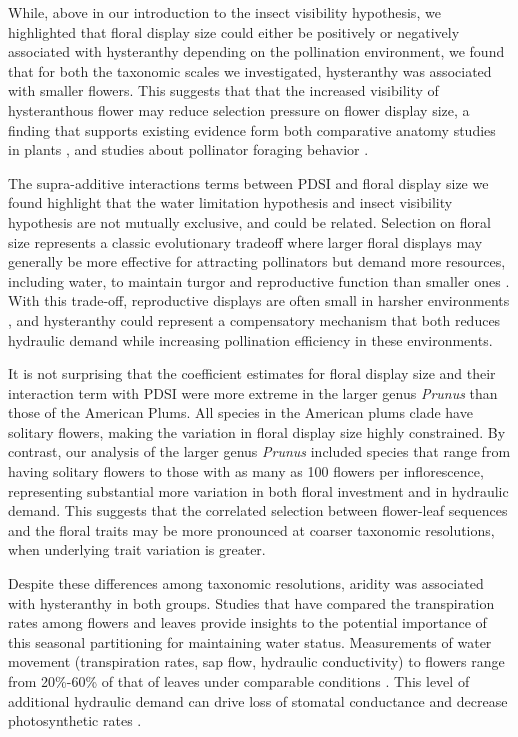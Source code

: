 \documentclass{article}[12pt]
\begin{document}
While, above in our introduction to the insect visibility hypothesis, we highlighted that floral display size could either be positively or negatively associated with hysteranthy depending on the pollination environment, we found that for both the taxonomic scales we investigated, hysteranthy was associated with smaller flowers. This suggests that that the increased visibility of hysteranthous flower may reduce selection pressure on flower display size, a finding that supports existing evidence form both comparative anatomy studies in plants \citep{Gunatilleke1984}, and studies about pollinator foraging behavior \citep{Forrest:2009aa,Rivest:2017aa}.

The supra-additive interactions terms between PDSI and floral display size we found highlight that the water limitation hypothesis and insect visibility hypothesis are not mutually exclusive, and could be related. Selection on floral size represents a classic evolutionary tradeoff where larger floral displays may generally be more effective for attracting pollinators but demand more resources, including water, to maintain turgor and reproductive function than smaller ones \citep{Galen:1999vr,Lambrecht:2007ur}. With this trade-off, reproductive displays are often small in harsher environments \citep{Teixido:2016aa,Lambrecht:2013aa}, and hysteranthy could represent a compensatory mechanism that both reduces hydraulic demand while increasing pollination efficiency in these environments.

It is not surprising that the coefficient estimates for floral display size and their interaction term with PDSI were more extreme in the larger genus \emph{Prunus} than those of the American Plums. All species in the American plums clade have solitary flowers, making the variation in floral display size highly constrained. By contrast, our analysis of the larger genus \emph{Prunus} included species that range from having solitary flowers to those with as many as 100 flowers per inflorescence, representing substantial more variation in both floral investment and in hydraulic demand. This suggests that the correlated selection between flower-leaf sequences and the floral traits may be more pronounced at coarser taxonomic resolutions, when underlying trait variation is greater.

Despite these differences among taxonomic resolutions, aridity was associated with hysteranthy in both groups. Studies that have compared the transpiration rates among flowers and leaves provide insights to the potential importance of this seasonal partitioning for maintaining water status. Measurements of water movement (transpiration rates, sap flow, hydraulic conductivity) to flowers range from 20\%-60\% of that of leaves under comparable conditions \citep{Whiley:1988uf,Roddy:2012wn,Liu:2017wg,McMann:2022ww}. This level of additional hydraulic demand can drive loss of stomatal conductance and decrease photosynthetic rates \citep{Galen:1999vr}.
 
\end{document}
